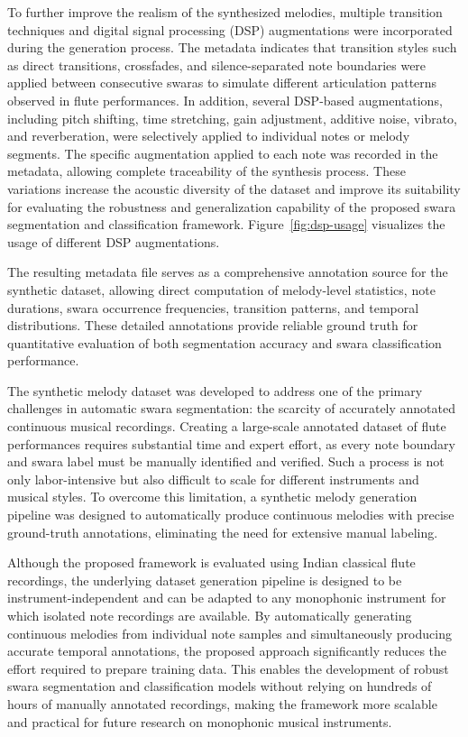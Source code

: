 To further improve the realism of the synthesized melodies, multiple transition techniques and digital signal processing (DSP) augmentations were incorporated during the generation process. The metadata indicates that transition styles such as direct transitions, crossfades, and silence-separated note boundaries were applied between consecutive swaras to simulate different articulation patterns observed in flute performances. In addition, several DSP-based augmentations, including pitch shifting, time stretching, gain adjustment, additive noise, vibrato, and reverberation, were selectively applied to individual notes or melody segments. The specific augmentation applied to each note was recorded in the metadata, allowing complete traceability of the synthesis process. These variations increase the acoustic diversity of the dataset and improve its suitability for evaluating the robustness and generalization capability of the proposed swara segmentation and classification framework. Figure~\ref{fig:dsp-usage} visualizes the usage of different DSP augmentations.


The resulting metadata file serves as a comprehensive annotation source for the synthetic dataset, allowing direct computation of melody-level statistics, note durations, swara occurrence frequencies, transition patterns, and temporal distributions. These detailed annotations provide reliable ground truth for quantitative evaluation of both segmentation accuracy and swara classification performance.

The synthetic melody dataset was developed to address one of the primary challenges in automatic swara segmentation: the scarcity of accurately annotated continuous musical recordings. Creating a large-scale annotated dataset of flute performances requires substantial time and expert effort, as every note boundary and swara label must be manually identified and verified. Such a process is not only labor-intensive but also difficult to scale for different instruments and musical styles. To overcome this limitation, a synthetic melody generation pipeline was designed to automatically produce continuous melodies with precise ground-truth annotations, eliminating the need for extensive manual labeling.

Although the proposed framework is evaluated using Indian classical flute recordings, the underlying dataset generation pipeline is designed to be instrument-independent and can be adapted to any monophonic instrument for which isolated note recordings are available. By automatically generating continuous melodies from individual note samples and simultaneously producing accurate temporal annotations, the proposed approach significantly reduces the effort required to prepare training data. This enables the development of robust swara segmentation and classification models without relying on hundreds of hours of manually annotated recordings, making the framework more scalable and practical for future research on monophonic musical instruments.
